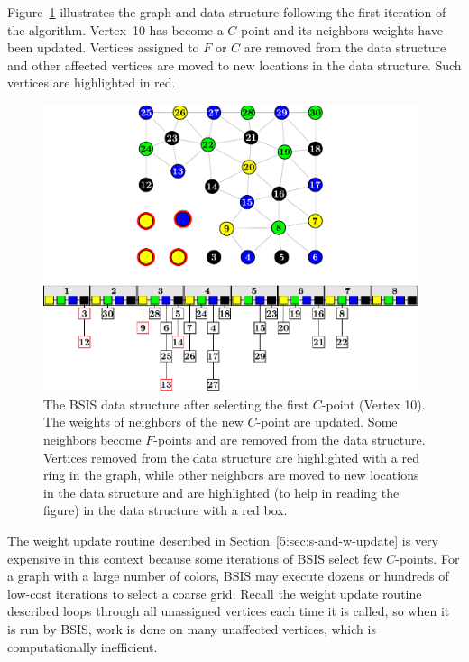 \documentclass{elsart}
\begin{document}
Figure~\ref{5:fig:bucket-algorithm-cp1} illustrates the graph and data
structure following the first iteration of the algorithm. Vertex~10
has become a $C$-point and its neighbors weights have been
updated. Vertices assigned to $F$ or $C$ are removed from the data
structure and other affected vertices are moved to new locations in
the data structure. Such vertices are highlighted in red.
\begin{figure}
  \begin{center}
    \includegraphics[width=0.98\textwidth]{images/BSIS/cp1}
    \caption{The BSIS data structure after selecting the first
    $C$-point (Vertex 10). The weights of neighbors of the new
    $C$-point are updated. Some neighbors become $F$-points and are
    removed from the data structure. Vertices removed from the data
    structure are highlighted with a red ring in the graph, while
    other neighbors are moved to new locations in the data structure
    and are highlighted (to help in reading the figure) in the data
    structure with a red box.}
    \label{5:fig:bucket-algorithm-cp1}
  \end{center}
\end{figure}

The weight update routine described in
Section~\ref{5:sec:s-and-w-update} is very expensive in this context
because some iterations of BSIS select few $C$-points. For a graph
with a large number of colors, BSIS may execute dozens or hundreds of
low-cost iterations to select a coarse grid. Recall the weight update
routine described loops through all unassigned vertices each time it
is called, so when it is run by BSIS, work is done on many unaffected
vertices, which is computationally inefficient.
\end{document}
